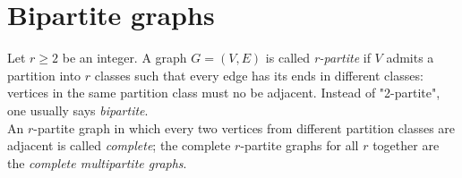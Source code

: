 	\section{Bipartite graphs}
		Let $r \geq 2$ be an integer. A graph $G = (V, E)$ is called \textit{r-partite} if $V$ admits a partition into $r$ classes such that every edge has its ends in different classes: vertices in the same partition class must no be adjacent. Instead of "2-partite", one usually says \textit{bipartite}.\\
		
		An $r$-partite graph in which every two vertices from different partition classes are adjacent is called \textit{complete}; the complete $r$-partite graphs for all $r$ together are the \textit{complete multipartite graphs}.


